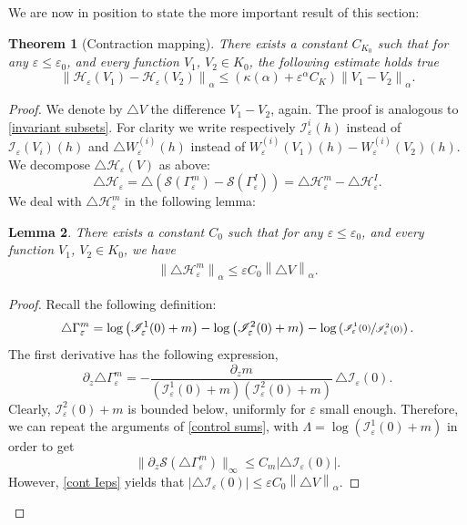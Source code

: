\documentclass[JEP,XML,SOM,Unicode]{cedram}
\let\mathcal\mathscr
\newcommand{\cI}{\mathcal{I}}
\newcommand{\cS}{\mathcal{S}}
\theoremstyle{plain}
\newtheorem{thm}{Theorem}[section]
\newtheorem{lem}[thm]{Lemma}
\theoremstyle{definition}
\renewcommand{\H}{\mathcal{H}_\eps}
\let\eps\varepsilon
\newcommand{\nalph}[1]{\left\lVert#1\right\rVert_\alpha}
\newcommand{\Gammam}{\Gamma^m_{\eps}}
\newcommand{\GammaI}{\Gamma^I_{\eps}}
\begin{document}
We are now in position to state the more important result of this section:

\begin{thm}[Contraction mapping]\label{contraction mapping}
There exists a constant $C_{K_0}$ such that for any $\eps\leq \eps_0$, and every function $V_1$, $V_2 \in K_0$, the following estimate holds true
\begin{equation}\label{eq: contraction th}
\nalph{ \H(V_1)- \H(V_2)} \leq (\kappa(\alpha) + \eps^\alpha C_K)\nalph{V_1-V_2}.
\end{equation}
\end{thm}
\begin{proof}
We denote by $\triangle V$ the difference $V_1 - V_2$, again.
The proof is analogous to \cref{invariant subsets}.
For clarity we write respectively $\cI_\eps^i(h) $ instead of $\cI_\eps(V_i) (h)$ and $\triangle W_\eps^{(i)}(h)$ instead of $W_\eps^{(i)}(V_1) (h)-W_\eps^{(i)}(V_2) (h)$.
We decompose $ \triangle \H(V)$ as above:
\begin{equation*}
\triangle \H = \triangle \left (\cS(\Gammam) - \cS(\GammaI)\right) = \triangle \H^m - \triangle \H^I.
\end{equation*}
We deal with $\triangle \H^m$ in the following lemma:
\begin{lem}\label{unif bound affpart diff}
There exists a constant $C_{0}$ such that for any $\eps\leq \eps_0$, and every function $V_1$, $V_2 \in K_0$, we have
\begin{align*}
\nalph{\triangle \H^m} \leq \eps C_0 \nalph{ \triangle V }.
\end{align*}
\end{lem}

\begin{proof}
Recall the following definition:
\begin{equation*}
\triangle \Gammam = \log\left (\cI_\eps^1(0) + m \right) - \log\left (\cI_\eps^2(0) + m \right) - \log\left (\sfrac{\cI_\eps^1(0) }{\cI_\eps^2(0) } \right).
\end{equation*}
The first derivative has the following expression,
\begin{equation}\label{eq:triangle gammam}
\partial_z \triangle \Gammam = - \dfrac{\partial_z m}{(\cI_\eps^1(0) + m)(\cI_\eps^2(0) + m)}\, \triangle \cI_\eps(0).
\end{equation}
Clearly, $\cI_\eps^2(0) + m$ is bounded below, uniformly for $\eps$ small enough. Therefore, we can repeat the arguments of \cref{control sums}, with $\Lambda = \log(\cI_\eps^1(0) + m)$ in order to get
\begin{equation*}
\|\partial_z \cS(\triangle \Gammam)\|_{\infty} \leq
C_m |\triangle \cI_\eps(0)|.
\end{equation*}
However, \cref{cont Ieps} yields that $|\triangle \cI_\eps(0)| \leq \eps C_{0} \nalph{\triangle V}$.


\end{proof}
\end{proof}
\end{document}
